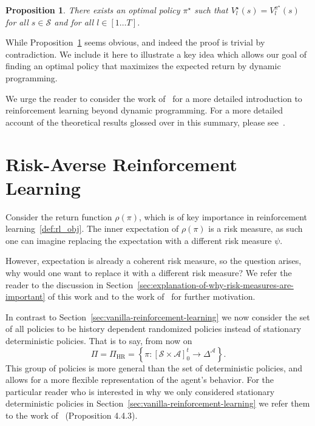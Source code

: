 \documentclass[10pt]{article}
\renewcommand{\cite}{\citep}
\theoremstyle{plain}
\newtheorem{proposition}{Proposition}
\theoremstyle{remark}
\begin{document}
\begin{proposition}\label{prop:optimal_policy_value}
        There exists an optimal policy $\pi^\star$ such that $V^\star_l(s) = V^{\pi^\star}_l(s)$ for all $s \in \mathcal{S}$ and for all $l \in [1\ldots T]$.
\end{proposition}

While Proposition~\ref{prop:optimal_policy_value} seems obvious, and indeed the proof is trivial by contradiction. We include it here to illustrate a key idea which allows our goal of finding an optimal policy that maximizes the expected return by dynamic programming.

We urge the reader to consider the work of~\cite{sutton2018} for a more detailed introduction to reinforcement learning beyond dynamic programming.
For a more detailed account of the theoretical results glossed over in this summary, please see~\cite{Puterman1994}.

\section{Risk-Averse Reinforcement Learning}

Consider the return function $\rho(\pi)$, which is of key importance in reinforcement learning~\ref{def:rl_obj}. 
The inner expectation of $\rho(\pi)$ is a risk measure, as such one can imagine replacing the expectation
with a different risk measure $\psi$.

However, expectation is already a coherent risk measure, so the question arises, why would one want to replace it with a different risk measure? 
We refer the reader to the discussion in Section~\ref{sec:explanation-of-why-risk-measures-are-important} of this
work and to the work of~\cite{Bauerle2011, follmer2016, howard1972} for further motivation. 

In contrast to Section~\ref{sec:vanilla-reinforcement-learning} we now consider the set of all policies to be history dependent randomized policies instead of stationary deterministic policies. That is to say, from now on 
\[ 
        \Pi = \Pi_{\text{HR}} = \left\{ \pi : {[\mathcal{S} \times \mathcal{A}]}_{0}^{t} \to \Delta^\mathcal{A} \right\}.
\]
This group of policies is more general than the set of deterministic policies, and allows for a more flexible representation of the agent's behavior.
For the particular reader who is interested in why we only considered stationary deterministic policies in Section~\ref{sec:vanilla-reinforcement-learning} we refer them to the work of~\cite{Puterman1994} (Proposition 4.4.3).
\end{document}

